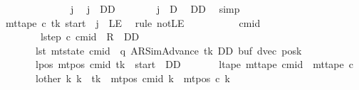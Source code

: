 \begin{isabellebody}
\ \ \ \ \isamarkupfalse%
\ {\isacharminus}{\kern0pt}\isanewline
\ \ \ \ \ \ \isamarkupfalse%
\ j\ \isamarkupfalse%
\ {\isachardoublequoteopen}j\ {\isacharless}{\kern0pt}\ DD{\isachardoublequoteclose}\isanewline
\ \ \ \ \ \ \isamarkupfalse%
\ {\isachardoublequoteopen}j\ {\isacharless}{\kern0pt}\ {\isacharquery}{\kern0pt}D{\isachardoublequoteclose}\ \isamarkupfalse%
\ DD\ \isamarkupfalse%
\ simp\isanewline
\ \ \ \ \ \ \isamarkupfalse%
\ {\isachardoublequoteopen}mt{\isacharunderscore}{\kern0pt}tape\ c{}\ tk\ {\isacharparenleft}{\kern0pt}{\isacharquery}{\kern0pt}start\ {\isacharminus}{\kern0pt}\ j{\isacharparenright}{\kern0pt}\ {\isasymnoteq}\ LE{}{\isachardoublequoteclose}\ \isamarkupfalse%
\ {\isacharparenleft}{\kern0pt}rule\ notLE{\isacharparenright}{\kern0pt}\isanewline
\ \ \ \ \isamarkupfalse%
\isanewline
\ \ \ \ \isamarkupfalse%
\ cmid\ \isanewline
\ \ \ \ \ \ \ \ lstep{\isacharcolon}{\kern0pt}\ {\isachardoublequoteopen}{\isacharparenleft}{\kern0pt}c{}{\isacharcomma}{\kern0pt}\ cmid{\isacharparenright}{\kern0pt}\ {\isasymin}\ {\isacharquery}{\kern0pt}R\ {\isacharcircum}{\kern0pt}{\isacharcircum}{\kern0pt}\ DD{\isachardoublequoteclose}\isanewline
\ \ \ \ \ \ \ lst{\isacharcolon}{\kern0pt}\ {\isachardoublequoteopen}mt{\isacharunderscore}{\kern0pt}state\ cmid\ {\isacharequal}{\kern0pt}\ {\isacharparenleft}{\kern0pt}q{\isacharcomma}{\kern0pt}\ AR{\isacharunderscore}{\kern0pt}SimAdvance{\isacharcomma}{\kern0pt}\ tk{\isacharcomma}{\kern0pt}\ DD{\isacharcomma}{\kern0pt}\ buf{\isacharcomma}{\kern0pt}\ dvec{\isacharcomma}{\kern0pt}\ posk{\isacharparenright}{\kern0pt}{\isachardoublequoteclose}\isanewline
\ \ \ \ \ \ \ lpos{\isacharcolon}{\kern0pt}\ {\isachardoublequoteopen}mt{\isacharunderscore}{\kern0pt}pos\ cmid\ tk\ {\isacharequal}{\kern0pt}\ {\isacharquery}{\kern0pt}start\ {\isacharminus}{\kern0pt}\ DD{\isachardoublequoteclose}\isanewline
\ \ \ \ \ \ \ ltape{\isacharcolon}{\kern0pt}\ {\isachardoublequoteopen}mt{\isacharunderscore}{\kern0pt}tape\ cmid\ {\isacharequal}{\kern0pt}\ mt{\isacharunderscore}{\kern0pt}tape\ c{}{\isachardoublequoteclose}\isanewline
\ \ \ \ \ \ \ lother{\isacharcolon}{\kern0pt}\ {\isachardoublequoteopen}{\isasymforall}k{\isacharprime}{\kern0pt}{\isachardot}{\kern0pt}\ k{\isacharprime}{\kern0pt}\ {\isasymnoteq}\ tk\ {\isasymlongrightarrow}\ mt{\isacharunderscore}{\kern0pt}pos\ cmid\ k{\isacharprime}{\kern0pt}\ {\isacharequal}{\kern0pt}\ mt{\isacharunderscore}{\kern0pt}pos\ c{}\ k{\isacharprime}{\kern0pt}{\isachardoublequoteclose}\isanewline

\end{isabellebody}
